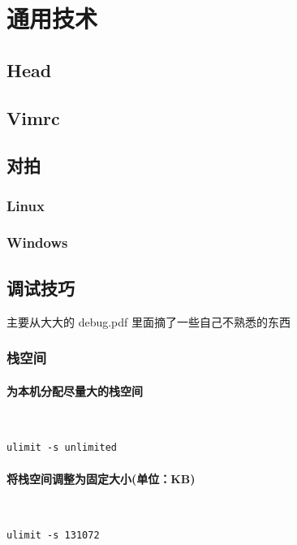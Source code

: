 %
%
	\newpage
	\section{通用技术}
	\subsection{Head}
	
	\newpage
	\subsection{Vimrc}
	
	\newpage
	\subsection{对拍}
	\subsubsection*{Linux}
	
	\vspace{2cm}
	\subsubsection*{Windows}
	
	\newpage
	\subsection{调试技巧}
	主要从大大的 debug.pdf 里面摘了一些自己不熟悉的东西
	\subsubsection{栈空间}
	\paragraph{为本机分配尽量大的栈空间}~\\
	\begin{lstlisting}[numbers=none]
		ulimit -s unlimited
	\end{lstlisting}
	\paragraph{将栈空间调整为固定大小(单位：KB)}~\\
	\begin{lstlisting}[numbers=none]
		ulimit -s 131072
	\end{lstlisting}
